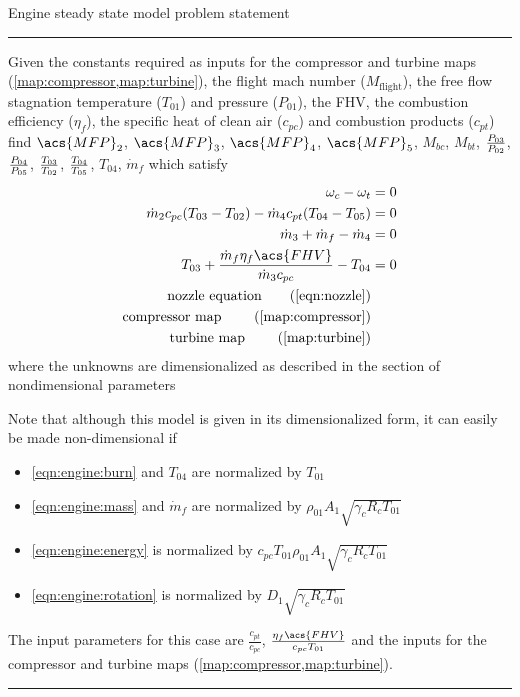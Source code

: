 \begin{table}[b]
\centering
    \caption{Engine steady state model problem statement}
    \label{map:engine}
\begin{minipage}{0.7\textwidth}
    \hrule\vspace{2pt}

    Given the constants required as inputs for the compressor and turbine maps (\cref{map:compressor,map:turbine}), 
    the flight mach number ($M_\text{flight}$), the free flow stagnation temperature ($T_{01}$) and pressure ($P_{01}$), 
    the \acf{FHV}, the combustion efficiency ($\eta_f$),
    the specific heat of clean air ($c_{pc}$) and combustion products ($c_{pt}$) \\ 
    find $\acs{MFP}_2$, $\acs{MFP}_3$, $\acs{MFP}_4$, $\acs{MFP}_5$, $M_{bc}$, $M_{bt}$, $\frac{P_{03}}{P_{02}}$, $\frac{P_{04}}{P_{05}}$, $\frac{T_{03}}{T_{02}}$, $\frac{T_{04}}{T_{05}}$, $T_{04}$, $\dot{m}_f$
    which satisfy
\begin{align}
    \omega_c - \omega_t &= 0 \label{eqn:engine:rotation} \\
    \dot{m}_2 c_{pc} (T_{03}-T_{02}) - \dot{m}_4 c_{pt}(T_{04}-T_{05}) &= 0 \label{eqn:engine:energy}\\
    \dot{m}_3 + \dot{m}_f - \dot{m}_4 &= 0 \label{eqn:engine:mass} \\
    T_{03} + \frac{\dot{m}_f \eta_f \acs{FHV}}{\dot{m}_3 c_{pc}} - T_{04} &= 0 \label{eqn:engine:burn} \\
    \text{nozzle equation} \tag{\cref{eqn:nozzle}} \\
    \text{compressor map } \tag{\cref{map:compressor}} \\
    \text{turbine map    } \tag{\cref{map:turbine}}
\end{align}
   where the unknowns are dimensionalized as described in the section of nondimensional parameters

Note that although this model is given in its dimensionalized form, it can easily be made non-dimensional if
\begin{itemize}
    \item \cref{eqn:engine:burn} and $T_{04}$ are normalized by $T_{01}$
    \item \cref{eqn:engine:mass} and $\dot{m}_f$ are normalized by $\rho_{01} A_1 \sqrt{\gamma_c R_c T_{01}}$
    \item \cref{eqn:engine:energy} is normalized by $c_{pc} T_{01} \rho_{01} A_1 \sqrt{\gamma_c R_c T_{01}}$
    \item \cref{eqn:engine:rotation} is normalized by $D_1\sqrt{\gamma_c R_c T_{01}}$
\end{itemize}
    The input parameters for this case are $\frac{c_{pt}}{c_{pc}}$, $\frac{\eta_f \acs{FHV}}{c_{pc} T_{01}}$ 
and the inputs for the compressor and turbine maps (\cref{map:compressor,map:turbine}).

    \hrule
\end{minipage}
\end{table}

